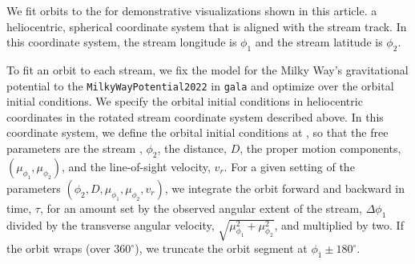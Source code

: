 \documentclass[final,5p,times,twocolumn,authoryear]{elsarticle}
\begin{document}
We fit orbits to the  for demonstrative visualizations shown in this article.
 a heliocentric, spherical coordinate system that is aligned with the stream track.
In this coordinate system, the stream longitude is $\phi_1$ and the stream latitude is
$\phi_2$.

To fit an orbit to each stream, we fix the model for the Milky Way's gravitational
potential to the \texttt{MilkyWayPotential2022} in \texttt{gala}
\citep{price-whelan:2017} and optimize over the orbital initial conditions.
We specify the orbital initial conditions in heliocentric coordinates in the rotated
stream coordinate system described above.
In this coordinate system, we define the orbital initial conditions at ,
so that the free parameters are the stream , $\phi_2$, the distance, $D$, the
proper motion components, $(\mu_{\phi_1}, \mu_{\phi_2})$, and the line-of-sight
velocity, $v_r$.
For a given setting of the parameters $(\phi_2, D, \mu_{\phi_1}, \mu_{\phi_2}, v_r)$, we
integrate the orbit forward and backward in time, $\tau$, for an amount set by the
observed angular extent of the stream, $\Delta \phi_1$ divided by the transverse angular
velocity, $\sqrt{\mu_{\phi_1}^2 + \mu_{\phi_2}^2}$, and multiplied by two.
If the orbit wraps (over $360^\circ$), we truncate the orbit segment at $\phi_1 \pm
180^\circ$.
\end{document}
